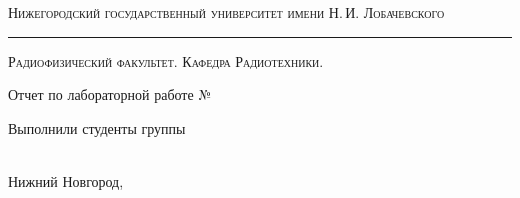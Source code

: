 \begin{titlepage}

\begin{center}

{\small\textsc{Нижегородский государственный университет имени Н.\,И. Лобачевского}}
\vskip 1pt \hrule \vskip 3pt
{\small\textsc{Радиофизический факультет. Кафедра Радиотехники.}}

\vfill

{\Large Отчет по лабораторной работе №\labnumber\vskip 12pt\bfseries \labtheme}
	
\end{center}

\vfill
	
\begin{flushright}
	{Выполнили студенты группы \labgroup\\\ \labauthors}%
\end{flushright}
	
\vfill
	
\begin{center}
	Нижний Новгород, \the\year
\end{center}

\end{titlepage}

